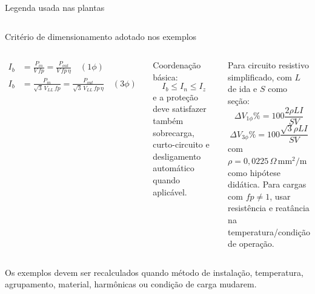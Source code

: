 \begin{frame}{Legenda usada nas plantas}
\small
\begin{columns}[T,onlytextwidth]
\end{columns}
\end{frame}

\begin{frame}[shrink=10]{Critério de dimensionamento adotado nos exemplos}
\small
\begin{columns}[T,onlytextwidth]
\begin{align*}
I_b&=\frac{P_{in}}{V\,fp}=\frac{P_{out}}{V\,fp\,\eta}\quad (1\phi)\\
I_b&=\frac{P_{in}}{\sqrt3\,V_{LL}\,fp}=\frac{P_{out}}{\sqrt3\,V_{LL}\,fp\,\eta}\quad (3\phi)
\end{align*}
\begin{caixaEx}
Coordenação básica:
\[
I_b\le I_n\le I_z
\]
e a proteção deve satisfazer também sobrecarga, curto-circuito e desligamento automático quando aplicável.
\end{caixaEx}
Para circuito resistivo simplificado, com $L$ de ida e $S$ como seção:
\[
\Delta V_{1\phi}\%=100\frac{2\rho L I}{SV}
\]
\[
\Delta V_{3\phi}\%=100\frac{\sqrt3\rho L I}{SV}
\]
com $\rho=0{,}0225\,\Omega\,\mathrm{mm^2/m}$ como hipótese didática. Para cargas com $fp\neq1$, usar resistência e reatância na temperatura/condição de operação.
\end{columns}
\begin{caixaObs}
Os exemplos devem ser recalculados quando método de instalação, temperatura, agrupamento, material, harmônicas ou condição de carga mudarem.
\end{caixaObs}
\end{frame}

